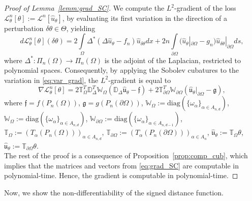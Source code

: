 \documentclass[pdflatex]{sn-jnl}%
\begin{document}
\begin{proof}[Proof of Lemma~\ref{lemm:grad_SC}]
 We compute the $L^2$-gradient of the loss $\mathcal{L}^n_\theta[\theta]:=\mathcal{L}^n[\hat{u}_\theta]$, by evaluating its first variation in the direction of a perturbation $\delta\theta \in \Theta$, yielding
\begin{equation}\label{eq:var_grad}
    d\mathcal{L}^n_\theta[\theta](\delta \theta) = 2\int\limits_{\Omega}\Delta^*(\Delta \hat{u}_\theta-f_n)\hat{u}_{\delta\theta} dx + 2n\int\limits_{\partial\Omega}( \hat{u}_\theta|_{\partial\Omega}-g_n)\hat{u}_{\delta\theta}|_{\partial\Omega} ds,
\end{equation}
where $\Delta^*:\Pi_{n}(\Omega)\rightarrow\Pi_{n}(\Omega)$ is the adjoint of the Laplacian, restricted to polynomial spaces. 
Consequently, by applying the Sobolev cubatures to the variation in \eqref{eq:var_grad}, the $L^2$-gradient is equal to 
\begin{equation}\label{eq:grad_SC}
 \nabla\mathcal{L}^n_\theta[\theta] = 2\mathbb{T}_\Omega^T\mathbb{D}^T_{\Delta }\mathbb{W}_\Omega(\mathbb{D}_{\Delta }\hat{\mathfrak{u}}_\theta -\mathfrak{f})+2\mathbb{T}^T_{\partial\Omega}\mathbb{W}_{\partial\Omega}(\hat{\mathfrak{u}}_\theta|_{\partial\Omega}-\mathfrak{g}),
\end{equation}
where $\mathfrak{f} = f(P_{n}(\Omega))$, $\mathfrak{g} = g(P_{n}(\partial\Omega))$, $\mathbb{W}_\Omega:=\mathrm{diag}(\{\omega_\alpha\}_{\alpha\in A_{n,d}})$, $\mathbb{W}_\Omega:=\mathrm{diag}(\{\omega_\alpha\}_{\alpha\in A_{n,d}})$, $\mathbb{W}_{\partial\Omega}:=\mathrm{diag}(\{\omega_\alpha\}_{\alpha\in A_{n,d-1}})$, $\mathbb{T}_\Omega:=(T_\alpha(P_{n}(\Omega)))_{\alpha\in A_{n,d}}$, $\mathbb{T}_{\partial\Omega}:=(T_\alpha(P_{n}(\partial\Omega)))_{\alpha\in A_{n}}$, $\hat{\mathfrak{u}}_\theta:=\mathbb{T}_\Omega\theta$, $\hat{\mathfrak{u}}_\theta:=\mathbb{T}_{\partial\Omega}\theta$.
\\
The rest of the proof is a consequence of Proposition~\ref{prop:comp_cub}, which implies that the matrices and vectors from \eqref{eq:grad_SC} are computable in polynomial-time. Hence, the gradient is computable in polynomial-time. 
\end{proof}
Now, we show the non-differentiability of the signed distance function.
\end{document}
